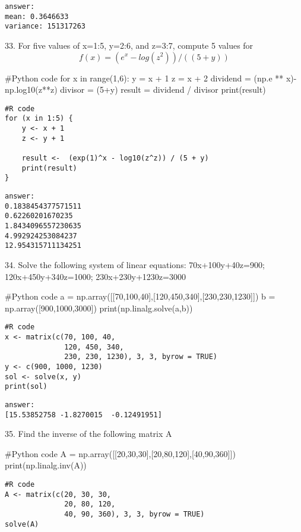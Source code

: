 \documentclass{article}
\begin{document}
\begin{verbatim}
answer: 
mean: 0.3646633
variance: 151317263
\end{verbatim}


33. For five values of x=1:5, y=2:6, and z=3:7, compute 5 values for \[f(x)=(e^x-log⁡(z^2))/((5+y))\]
\begin{pythoncode}
#Python code
for x in range(1,6):
    y = x + 1
    z = x + 2
    dividend = (np.e ** x)-np.log10(z**z)
    divisor = (5+y)
    result = dividend / divisor
    print(result)
\end{pythoncode}

\begin{verbatim}
#R code
for (x in 1:5) {
    y <- x + 1
    z <- y + 1

    result <-  (exp(1)^x - log10(z^z)) / (5 + y)
    print(result)
}
\end{verbatim}

\begin{verbatim}
answer: 
0.1838454377571511
0.62260201670235
1.8434096557230635
4.992924253084237
12.954315711134251
\end{verbatim}


34.	Solve the following system of linear equations:
70x+100y+40z=900; 120x+450y+340z=1000; 230x+230y+1230z=3000

\begin{pythoncode}
#Python code
a = np.array([[70,100,40],[120,450,340],[230,230,1230]])
b = np.array([900,1000,3000])
print(np.linalg.solve(a,b))
\end{pythoncode}

\begin{verbatim}
#R code
x <- matrix(c(70, 100, 40,
              120, 450, 340,
              230, 230, 1230), 3, 3, byrow = TRUE)
y <- c(900, 1000, 1230)
sol <- solve(x, y)
print(sol)
\end{verbatim}

\begin{verbatim}
answer: 
[15.53852758 -1.8270015  -0.12491951]
\end{verbatim}


35. Find the inverse of the following matrix A
\begin{pythoncode}
#Python code
A = np.array([[20,30,30],[20,80,120],[40,90,360]])
print(np.linalg.inv(A))
\end{pythoncode}

\begin{verbatim}
#R code
A <- matrix(c(20, 30, 30,
              20, 80, 120,
              40, 90, 360), 3, 3, byrow = TRUE)
solve(A)
\end{verbatim}
\end{document}
